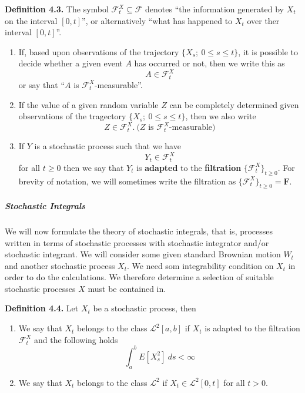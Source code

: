 \documentclass[
]{article}
\providecommand{\tightlist}{%
  \setlength{\itemsep}{0pt}\setlength{\parskip}{0pt}}
\begin{document}
\textbf{Definition 4.3.} The symbol
\(\mathcal{F}^X_t\subseteq\mathcal{F}\) denotes ``the information
generated by \(X_t\) on the interval \([0,t]\)'', or alternatively
``what has happened to \(X_t\) over ther interval \([0,t]\)''.

\begin{enumerate}
\def\labelenumi{\arabic{enumi}.}
\tightlist
\item
  If, based upon observations of the trajectory
  \(\{X_s;\ 0\le s\le t\}\), it is possible to decide whether a given
  event \(A\) has occurred or not, then we write this as \[
    A\in\mathcal{F}^X_t
    \] or say that ``\(A\) is \(\mathcal{F}^X_t\)-measurable''.
\item
  If the value of a given random variable \(Z\) can be completely
  determined given observations of the tragectory
  \(\{X_s;\ 0\le s\le t\}\), then we also write \[
    Z\in\mathcal{F}^X_t.\ \text{(}Z\text{ is }\mathcal{F}^X_t\text{-measurable)}
    \]
\item
  If \(Y\) is a stochastic process such that we have \[
    Y_t\in\mathcal{F}^X_t
    \] for all \(t\ge0\) then we say that \(Y_t\) is \textbf{adapted} to
  the \textbf{filtration} \(\{\mathcal{F}^X_t\}_{t\ge 0}\). For brevity
  of notation, we will sometimes write the filtration as
  \(\{\mathcal{F}^X_t\}_{t\ge 0}=\mathbf{F}\).
\end{enumerate}

\hypertarget{stochastic-integrals-1}{%
\subparagraph{Stochastic Integrals}\label{stochastic-integrals-1}}

We will now formulate the theory of stochastic integrals, that is,
processes written in terms of stochastic processes with stochastic
integrator and/or stochastic integrant. We will consider some given
standard Brownian motion \(W_t\) and another stochastic process \(X_t\).
We need som integrability condition on \(X_t\) in order to do the
calculations. We therefore determine a selection of suitable stochastic
processes \(X\) must be contained in.

\textbf{Definition 4.4.} Let \(X_t\) be a stochastic process, then

\begin{enumerate}
\def\labelenumi{\roman{enumi}.}
\tightlist
\item
  We say that \(X_t\) belongs to the class \(\mathcal{L}^2[a,b]\) if
  \(X_t\) is adapted to the filtration \(\mathcal{F}^X_t\) and the
  following holds \[\int_a^bE[X_s^2]\ ds<\infty\]
\item
  We say that \(X_t\) belongs to the class \(\mathcal{L}^2\) if
  \(X_t\in\mathcal{L}^2[0,t]\) for all \(t>0\).
\end{enumerate}
\end{document}
